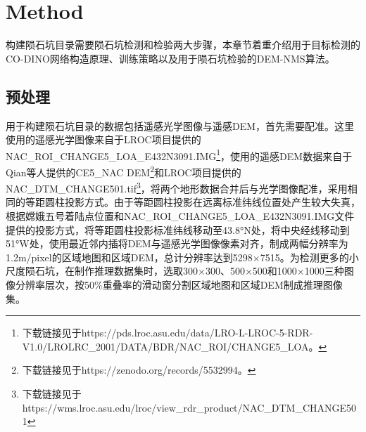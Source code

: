 \section{Method}
\label{sec:method}
构建陨石坑目录需要陨石坑检测和检验两大步骤，本章节着重介绍用于目标检测的CO-DINO网络构造原理、训练策略以及用于陨石坑检验的DEM-NMS算法。
\subsection{预处理}
用于构建陨石坑目录的数据包括遥感光学图像与遥感DEM，首先需要配准。这里使用的遥感光学图像来自于LROC项目提供的NAC\_ROI\_CHANGE5\_LOA\_E432N3091.IMG\footnote{ 下载链接见于https://pds.lroc.asu.edu/data/LRO-L-LROC-5-RDR-V1.0/LROLRC\_2001/DATA/BDR/NAC\_ROI/CHANGE5\_LOA。}，使用的遥感DEM数据来自于Qian\cite{qianCopernicanaged200Ma2021}等人提供的CE5\_NAC DEM\footnote{下载链接见于https://zenodo.org/records/5532994。}和LROC项目提供的NAC\_DTM\_CHANGE501.tif\footnote{ 下载链接见于https://wms.lroc.asu.edu/lroc/view\_rdr\_product/NAC\_DTM\_CHANGE501}，将两个地形数据合并后与光学图像配准，采用相同的等距圆柱投影方式。由于等距圆柱投影在远离标准纬线位置处产生较大失真，根据嫦娥五号着陆点位置和NAC\_ROI\_CHANGE5\_LOA\_E432N3091.IMG文件提供的投影方式，将等距圆柱投影标准纬线移动至43.8°N处，将中央经线移动到51°W处，使用最近邻内插将DEM与遥感光学图像像素对齐，制成两幅分辨率为1.2m/pixel的区域地图和区域DEM，总计分辨率达到5298×7515。为检测更多的小尺度陨石坑，在制作推理数据集时，选取300×300、500×500和1000×1000三种图像分辨率层次，按50\%重叠率的滑动窗分割区域地图和区域DEM制成推理图像集。
